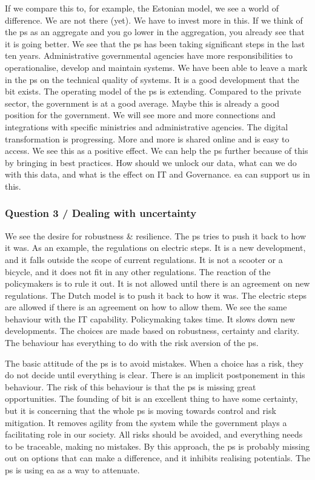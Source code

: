 If we compare this to, for example, the Estonian model, we see a world of difference. We are not there (yet). We have to invest more in this. If we think of the \gls{ps} as an aggregate and you go lower in the aggregation, you already see that it is going better. We see that the \gls{ps} has been taking significant steps in the last ten years. Administrative governmental agencies have more responsibilities to operationalise, develop and maintain systems. We have been able to leave a mark in the \acrshort{ps} on the technical quality of systems. It is a good development that the \acrshort{bit} exists. The operating model of the \gls{ps} is extending. Compared to the private sector, the government is at a good average. Maybe this is already a good position for the government. We will see more and more connections and integrations with specific ministries and administrative agencies. The digital transformation is progressing. More and more is shared online and is easy to access. We see this as a positive effect. We can help the \gls{ps} further because of this by bringing in best practices. How should we unlock our data, what can we do with this data, and what is the effect on IT and Governance. \gls{ea} can support us in this.
\subsubsection{Question 3 / Dealing with uncertainty}
We see the desire for robustness \& resilience. The \gls{ps} tries to push it back to how it was. As an example, the regulations on electric steps. It is a new development, and it falls outside the scope of current regulations. It is not a scooter or a bicycle, and it does not fit in any other regulations. The reaction of the policymakers is to rule it out. It is not allowed until there is an agreement on new regulations. The Dutch model is to push it back to how it was. The electric steps are allowed if there is an agreement on how to allow them. We see the same behaviour with the  IT capability. Policymaking takes time. It slows down new developments. The choices are made based on robustness, certainty and clarity. The behaviour has everything to do with the risk aversion of the \gls{ps}.

The basic attitude of the \gls{ps} is to avoid mistakes. When a choice has a risk, they do not decide until everything is clear. There is an implicit postponement in this behaviour. The risk of this behaviour is that the \gls{ps} is missing great opportunities. The founding of \acrshort{bit} is an excellent thing to have some certainty, but it is concerning that the whole \gls{ps} is moving towards control and risk mitigation. It removes agility from the system while the government plays a facilitating role in our society. All risks should be avoided, and everything needs to be traceable, making no mistakes. By this approach, the \gls{ps} is probably missing out on options that can make a difference, and it inhibits realising potentials. The \gls{ps} is using \gls{ea} as a way to attenuate. 
